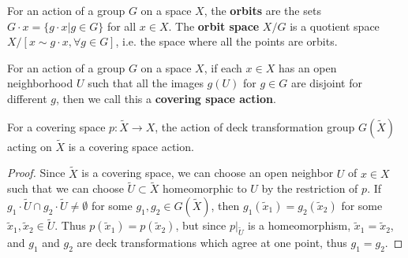 \begin{defn} For an action of a group $G$ on a space $X$, the \textbf{orbits} are the sets $G\cdot x=\{g\cdot x|g\in G\}$ for all $x\in X$. The \textbf{orbit space} $X/G$ is a quotient space $X/[x\sim g\cdot x,\forall g\in G]$, i.e. the space where all the points are orbits.
\end{defn}

\begin{defn} For an action of a group $G$ on a space $X$, if each $x\in X$ has an open neighborhood $U$ such that all the images $g(U)$ for $g\in G$ are disjoint for different $g$, then we call this a \textbf{covering space action}.
\end{defn}

\begin{prop} For a covering space $p:\tilde{X}\rightarrow X$, the action of deck transformation group $G(\tilde{X})$ acting on $\tilde{X}$ is a covering space action.
\end{prop}
\begin{proof}
Since $\tilde{X}$ is a covering space, we can choose an open neighbor $U$ of $x\in X$ such that we can choose $\tilde{U}\subset \tilde{X}$ homeomorphic to $U$ by the restriction of $p$. If $g_1\cdot \tilde{U}\cap g_2\cdot \tilde{U}\neq \emptyset$ for some $g_1,g_2\in G(\tilde{X})$, then $g_1(\tilde{x}_1)=g_2(\tilde{x}_2)$ for some $\tilde{x}_1,\tilde{x}_2\in \tilde{U}$. Thus $p(\tilde{x}_1)=p(\tilde{x}_2)$, but since $p|_{\tilde{U}}$ is a homeomorphism, $\tilde{x}_1=\tilde{x}_2$, and $g_1$ and $g_2$ are deck transformations which agree at one point, thus $g_1=g_2$.
\end{proof}

